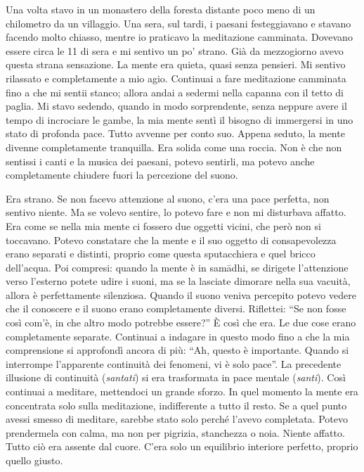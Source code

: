 Una volta stavo in un monastero della foresta distante poco meno di un
chilometro da un villaggio. Una sera, sul tardi, i paesani festeggiavano
e stavano facendo molto chiasso, mentre io praticavo la meditazione
camminata. Dovevano essere circa le 11 di sera e mi sentivo un po'
strano. Già da mezzogiorno avevo questa strana sensazione. La mente era
quieta, quasi senza pensieri. Mi sentivo rilassato e completamente a mio
agio. Continuai a fare meditazione camminata fino a che mi sentii
stanco; allora andai a sedermi nella capanna con il tetto di paglia. Mi
stavo sedendo, quando in modo sorprendente, senza neppure avere il tempo
di incrociare le gambe, la mia mente sentì il bisogno di immergersi in
uno stato di profonda pace. Tutto avvenne per conto suo. Appena seduto,
la mente divenne completamente tranquilla. Era solida come una roccia.
Non è che non sentissi i canti e la musica dei paesani, potevo sentirli,
ma potevo anche completamente chiudere fuori la percezione del suono.

Era strano. Se non facevo attenzione al suono, c'era una pace perfetta,
non sentivo niente. Ma se volevo sentire, lo potevo fare e non mi
disturbava affatto. Era come se nella mia mente ci fossero due oggetti
vicini, che però non si toccavano. Potevo constatare che la mente e il
suo oggetto di consapevolezza erano separati e distinti, proprio come
questa sputacchiera e quel bricco dell'acqua. Poi compresi: quando la
mente è in samādhi, se dirigete l'attenzione verso l'esterno potete
udire i suoni, ma se la lasciate dimorare nella sua vacuità, allora è
perfettamente silenziosa. Quando il suono veniva percepito potevo vedere
che il conoscere e il suono erano completamente diversi. Riflettei: ``Se
non fosse così com'è, in che altro modo potrebbe essere?'' È così che
era. Le due cose erano completamente separate. Continuai a indagare in
questo modo fino a che la mia comprensione si approfondì ancora di più:
``Ah, questo è importante. Quando si interrompe l'apparente continuità
dei fenomeni, vi è solo pace''. La precedente illusione di continuità
(\emph{santati}) si era trasformata in pace mentale (\emph{santi}). Così
continuai a meditare, mettendoci un grande sforzo. In quel momento la
mente era concentrata solo sulla meditazione, indifferente a tutto il
resto. Se a quel punto avessi smesso di meditare, sarebbe stato solo
perché l'avevo completata. Potevo prendermela con calma, ma non per
pigrizia, stanchezza o noia. Niente affatto. Tutto ciò era assente dal
cuore. C'era solo un equilibrio interiore perfetto, proprio quello
giusto.

